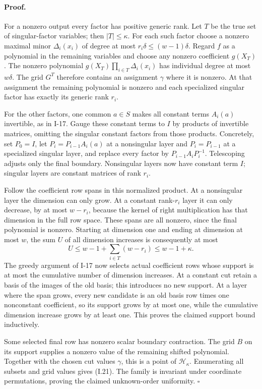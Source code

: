 \paragraph{Proof.}
For a nonzero output every factor has positive generic rank.
Let $T$ be the true set of singular-factor variables; then
$|T|\le\kappa$.  For each such factor choose a nonzero maximal
minor $\Delta_i(x_i)$ of degree at most
$r_i\delta\le(w-1)\delta$.  Regard $f$ as a polynomial in the
remaining variables and choose any nonzero coefficient $g(X_T)$.
The nonzero polynomial
$g(X_T)\prod_{i\in T}\Delta_i(x_i)$ has individual degree at most
$w\delta$.  The grid $G^T$ therefore contains an assignment
$\gamma$ where it is nonzero.  At that assignment the remaining
polynomial is nonzero and each specialized singular factor has
exactly its generic rank $r_i$.

For the other factors, one common $a\in S$ makes all constant
terms $A_i(a)$ invertible, as in I-17.  Gauge these constant terms
to $I$ by products of invertible matrices, omitting the singular
constant factors from those products.  Concretely, set $P_0=I$,
let $P_i=P_{i-1}A_i(a)$ at a nonsingular layer and
$P_i=P_{i-1}$ at a specialized singular layer, and replace every
factor by $P_{i-1}A_iP_i^{-1}$.  Telescoping adjusts only the final
boundary.  Nonsingular layers now have constant term $I$;
singular layers are constant matrices of rank $r_i$.

Follow the coefficient row spans in this normalized product.
At a nonsingular layer the dimension can only grow.  At a constant
rank-$r_i$ layer it can only decrease, by at most $w-r_i$, because
the kernel of right multiplication has that dimension in the full
row space.  These spans are all nonzero, since the final polynomial
is nonzero.  Starting at dimension one and ending at dimension at
most $w$, the sum $U$ of all dimension increases is consequently
at most
\[
 U\le w-1+\sum_{i\in T}(w-r_i)\le w-1+\kappa.
\]
The greedy argument of I-17 now selects actual coefficient rows
whose support is at most the cumulative number of dimension
increases.  At a constant cut retain a basis of the images of the
old basis; this introduces no new support.  At a layer where the
span grows, every new candidate is an old basis row times one
nonconstant coefficient, so its support grows by at most one,
while the cumulative dimension increase grows by at least one.
This proves the claimed support bound inductively.

Some selected final row has nonzero scalar boundary contraction.
The grid $B$ on its support supplies a nonzero value of the
remaining shifted polynomial.  Together with the chosen cut
values $\gamma$, this is a point of $\mathcal H_\kappa$.
Enumerating all subsets and grid values gives (I.21).  The family
is invariant under coordinate permutations, proving the claimed
unknown-order uniformity. \hfill$\square$

